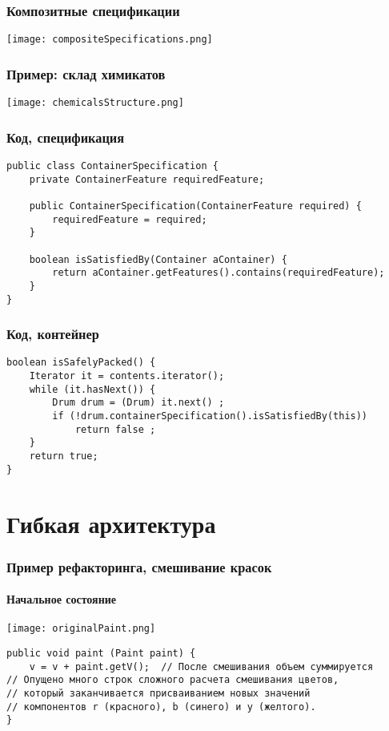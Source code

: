 \documentclass{../../slides-style}
\begin{document}
    \begin{frame}
        \frametitle{Композитные спецификации}
        \begin{center}
            \texttt{[image: compositeSpecifications.png]}
        \end{center}
    \end{frame}

    \begin{frame}
        \frametitle{Пример: склад химикатов}
        \begin{center}
            \texttt{[image: chemicalsStructure.png]}
        \end{center}
    \end{frame}

    \begin{frame}[fragile]
        \frametitle{Код, спецификация}
        \begin{verbatim}
public class ContainerSpecification {
    private ContainerFeature requiredFeature;

    public ContainerSpecification(ContainerFeature required) {
        requiredFeature = required;
    }

    boolean isSatisfiedBy(Container aContainer) {
        return aContainer.getFeatures().contains(requiredFeature);
    }
}
        \end{verbatim}
\end{frame}

    \begin{frame}[fragile]
        \frametitle{Код, контейнер}
        \begin{verbatim}
boolean isSafelyPacked() {
    Iterator it = contents.iterator();
    while (it.hasNext()) {
        Drum drum = (Drum) it.next() ;
        if (!drum.containerSpecification().isSatisfiedBy(this))
            return false ;
    }
    return true;
}
        \end{verbatim}
\end{frame}

    \section{Гибкая архитектура}

    \begin{frame}[fragile]
        \frametitle{Пример рефакторинга, смешивание красок}
        \framesubtitle{Начальное состояние}
        \begin{center}
            \texttt{[image: originalPaint.png]}
        \end{center}
        \begin{footnotesize}
            \begin{verbatim}
public void paint (Paint paint) {
    v = v + paint.getV();  // После смешивания объем суммируется
// Опущено много строк сложного расчета смешивания цветов,
// который заканчивается присваиванием новых значений
// компонентов r (красного), b (синего) и y (желтого).
}
            \end{verbatim}
        \end{footnotesize}
\end{frame}
\end{document}
